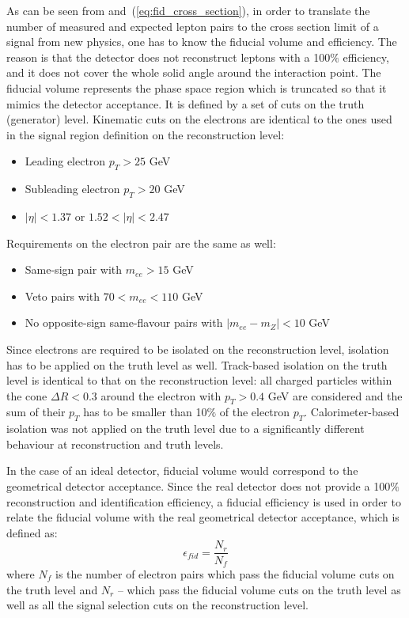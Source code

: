 As can be seen from  and~(\ref{eq:fid_cross_section}), in order to translate the number of measured and expected lepton pairs 
to the cross section limit of a signal from new physics, one has to know the fiducial volume and efficiency.
The reason is that the detector does not reconstruct leptons with a 100$\%$ efficiency, and it does not cover the whole solid angle around the interaction point.
The fiducial volume represents the phase space region which is truncated so that it mimics the detector acceptance.
It is defined by a set of cuts on the truth (generator) level. 
Kinematic cuts on the electrons are identical to the ones used in the signal region definition on the reconstruction level:
\begin{itemize}
 \item Leading electron $p_T > 25$ GeV
 \item Subleading electron $p_T > 20$ GeV
 \item $|\eta|<1.37$ or $1.52<|\eta|<2.47$
\end{itemize}
Requirements on the electron pair are the same as well:
\begin{itemize}
 \item Same-sign pair with $m_{ee} > 15$ GeV
 \item Veto pairs with $70 < m_{ee} < 110$ GeV
 \item No opposite-sign same-flavour pairs with $|m_{ee} - m_{Z}| < 10$ GeV
\end{itemize}
Since electrons are required to be isolated on the reconstruction level, isolation has to be applied on the truth level as well.
Track-based isolation on the truth level is identical to that on the reconstruction level:
all charged particles within the cone $\Delta R < 0.3$ around the electron with $p_T > 0.4$ GeV are considered and the
sum of their $p_T$ has to be smaller than 10$\%$ of the electron $p_T$.
Calorimeter-based isolation was not applied on the truth level due to a significantly different behaviour at reconstruction and truth levels.

In the case of an ideal detector, fiducial volume would correspond to the geometrical detector acceptance.
Since the real detector does not provide a 100$\%$ reconstruction and identification efficiency, a fiducial efficiency is used in order to relate the fiducial volume with the real geometrical detector acceptance, which is defined as:
\begin{equation}
 \epsilon_{fid} = \dfrac{N_r}{N_f}
\end{equation}
where $N_f$ is the number of electron pairs which pass the fiducial volume cuts on the truth level and $N_r$ -- which pass the fiducial volume cuts on the truth level 
as well as all the signal selection cuts on the reconstruction level.

